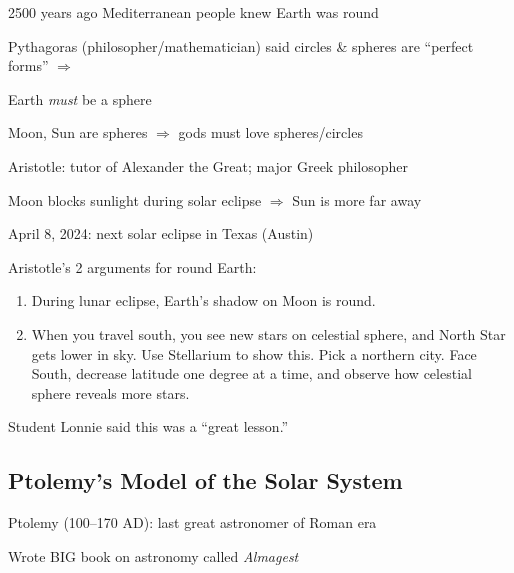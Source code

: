 \documentclass[main.tex]{subfiles}
\begin{document}
2500 years ago Mediterranean people knew Earth was round

Pythagoras {\color{lightgray} (philosopher/mathematician)} said circles \& spheres are ``perfect forms'' $\Rightarrow$ 

Earth \textit{must} be a sphere

Moon, Sun are spheres $\Rightarrow$ gods must love spheres/circles

Aristotle: tutor of Alexander the Great; major Greek philosopher

Moon blocks sunlight during solar eclipse $\Rightarrow$ Sun is more far away

\begin{figure}[h!]
    \centering
\end{figure}

April 8, 2024: next solar eclipse in Texas (Austin)

Aristotle's 2 arguments for round Earth:
\vspace{-1em}

\begin{enumerate}
\setlength\itemsep{0.1ex}
    \item During lunar eclipse, Earth's shadow on Moon is round.
    \item When you travel south, you see new stars on celestial sphere, and North Star gets lower in sky. {\color{lightgray} Use Stellarium to show this. Pick a northern city. Face South, decrease latitude one degree at a time, and observe how celestial sphere reveals more stars.}
\end{enumerate}

{\color{lightgray} Student Lonnie said this was a ``great lesson.''}

\hgraydashline

\subsection*{Ptolemy's Model of the Solar System}

Ptolemy (100--170 AD): last great astronomer of Roman era

Wrote BIG book on astronomy called \textit{Almagest}
\end{document}

